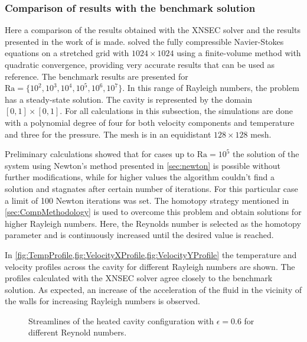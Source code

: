 \subsubsection{Comparison of results with the benchmark solution}

Here a comparison of the results obtained with the XNSEC solver and the results presented in the work of \textcite{vierendeelsBenchmarkSolutionsNatural2003} is made. \textcite{vierendeelsBenchmarkSolutionsNatural2003} solved the fully compressible Navier-Stokes equations on a stretched grid with $1024\times1024$ using a finite-volume method with quadratic convergence, providing very accurate results that can be used as reference.
The benchmark results are presented for $\text{Ra} = \{10^2,10^3,10^4,10^5,10^6,10^7\}$. In this range of Rayleigh numbers, the problem has a steady-state solution. 
The cavity is represented by the domain $[0,1]\times[0,1]$. For all calculations in this subsection, the simulations are done with a polynomial degree of four for both velocity components and temperature and three for the pressure. The mesh is in an equidistant $128\times128$ mesh.

Preliminary calculations showed that for cases up to $\text{Ra} = 10^5$ the solution of the system using Newton's method presented in \cref{sec:newton} is possible without further modifications, while for higher values the algorithm couldn't find a solution and stagnates after certain number of iterations. For this particular case a limit of 100 Newton iterations was set. The homotopy strategy mentioned in \cref{sec:CompMethodology} is used to overcome this problem and obtain solutions for higher Rayleigh numbers. Here, the Reynolds number is selected as the homotopy parameter and is continuously increased until the desired value is reached.

In \cref{fig:TempProfile,fig:VelocityXProfile,fig:VelocityYProfile} the temperature and velocity profiles across the cavity for different Rayleigh numbers are shown. The profiles calculated with the XNSEC solver agree closely to the benchmark solution. As expected, an increase of the acceleration of the fluid in the vicinity of the walls for increasing Rayleigh numbers is observed.
\begin{figure}[h]
	\centering
	\pgfplotsset{width=0.3 \textwidth, compat=1.3}
	\caption{Streamlines of the heated cavity configuration with $\epsilon = 0.6$ for different Reynold numbers.}\label{fig:HSCStreamlines}
\end{figure}


